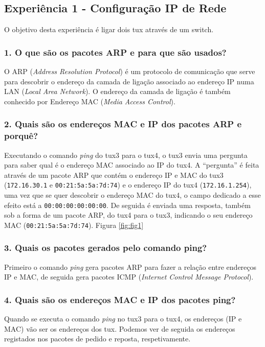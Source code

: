 \subsection*{Experiência 1 - Configuração IP de Rede}
O objetivo desta experiência é ligar dois tux através de um switch.

\subsubsection{1. O que são os pacotes ARP e para que são usados?}
O ARP (\emph{Address Resolution Protocol}) é um protocolo de comunicação que serve para descobrir o endereço da camada de ligação associado ao endereço IP numa LAN (\emph{Local Area Network}). O endereço da camada de ligação é também conhecido por Endereço MAC (\emph{Media Access Control}).

\subsubsection{2. Quais são os endereços MAC e IP dos pacotes ARP e porquê?}
Executando o comando \emph{ping} do tux3 para o tux4, o tux3 envia uma pergunta para saber qual é o endereço MAC associado ao IP do tux4. A \enquote{pergunta} é feita através de um pacote ARP que contém o endereço IP e MAC do tux3 (\verb+172.16.30.1+ e \verb+00:21:5a:5a:7d:74+) e o endereço IP do tux4 (\verb+172.16.1.254+), uma vez que se quer descobrir o endereço MAC do tux4, o campo dedicado a esse efeito está a \verb+00:00:00:00:00:00+. De seguida é enviada uma resposta, também sob a forma de um pacote ARP, do tux4 para o tux3, indicando o seu endereço MAC (\verb+00:21:5a:5a:7d:74+). Figura \ref{fig:fig1}

\subsubsection{3. Quais os pacotes gerados pelo comando ping?}
Primeiro o comando \emph{ping} gera pacotes ARP para fazer a relação entre endereços IP e MAC, de seguida gera pacotes ICMP (\emph{Internet Control Message Protocol}).

\subsubsection{4. Quais são os endereços MAC e IP dos pacotes ping?}
Quando se executa o comando \emph{ping} no tux3 para o tux4, os endereços (IP e MAC) vão ser os endereços dos tux. Podemos ver de seguida os endereços registados nos pacotes de pedido e reposta, respetivamente.

